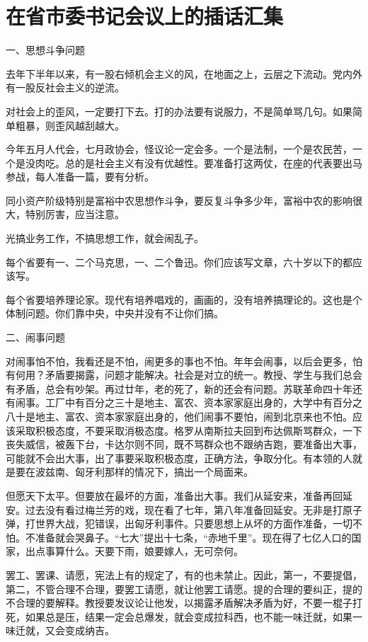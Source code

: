 \section[在省市委书记会议上的插话汇集（一九五七年一月）]{在省市委书记会议上的插话汇集}


一、思想斗争问题

去年下半年以来，有一股右倾机会主义的风，在地面之上，云层之下流动。党内外有一股反社会主义的逆流。

对社会上的歪风，一定要打下去。打的办法要有说服力，不是简单骂几句。如果简单粗暴，则歪风越刮越大。

今年五月人代会，七月政协会，怪议论一定会多。一个是法制，一个是农民苦，一个是没肉吃。总的是社会主义有没有优越性。要准备打这两仗，在座的代表要出马参战，每人准备一篇，要有分析。

同小资产阶级特别是富裕中农思想作斗争，要反复斗争多少年，富裕中农的影响很大，特别厉害，应当注意。

光搞业务工作，不搞思想工作，就会闹乱子。

每个省要有一、二个马克思，一、二个鲁迅。你们应该写文章，六十岁以下的都应该写。

每个省要培养理论家。现代有培养唱戏的，画画的，没有培养搞理论的。这也是个体制问题。你们靠中央，中央并没有不让你们搞。

二、闹事问题

对闹事怕不怕，我看还是不怕，闹更多的事也不怕。年年会闹事，以后会更多，怕有何用？矛盾要揭露，问题才能解决。社会是对立的统一。教授、学生与我们总会有矛盾，总会有吵架。再过廿年，老的死了，新的还会有问题。苏联革命四十年还有闹事。工厂中有百分之三十是地主、富农、资本家家庭出身的，大学中有百分之八十是地主、富农、资本家家庭出身的，他们闹事不要怕，闹到北京来也不怕。应该采取积极态度，不要采取消极态度。格罗从南斯拉夫回到布达佩斯骂群众，一下丧失威信，被轰下台，卡达尔则不同，既不骂群众也不跟纳吉跑，要准备出大事，可能就不会出大事，出了事要采取积极态度，正确方法，争取分化。有本领的人就是要在波兹南、匈牙利那样的情况下，搞出一个局面来。

但愿天下太平。但要放在最坏的方面，准备出大事。我们从延安来，准备再回延安。过去没有看过梅兰芳的戏，现在看了七年，第八年准备回延安。无非是打原子弹，打世界大战，犯错误，出匈牙利事件。只要思想上从坏的方面作准备，一切不怕。不准备就会哭鼻子。“七大”提出十七条，“赤地千里”。现在得了七亿人口的国家，出点事算什么。天要下雨，娘要嫁人，无可奈何。

罢工、罢课、请愿，宪法上有的规定了，有的也未禁止。因此，第一，不要提倡，第二，不管合理不合理，要罢工请愿，就让他罢工请愿。提的合理的要纠正，提的不合理的要解释。教授要发议论让他发，以揭露矛盾解决矛盾为好，不要一棍子打死，如果总是压，结果一定会总爆发，就会变成拉科西，也不能一味迁就，如果一味迁就，又会变成纳吉。

